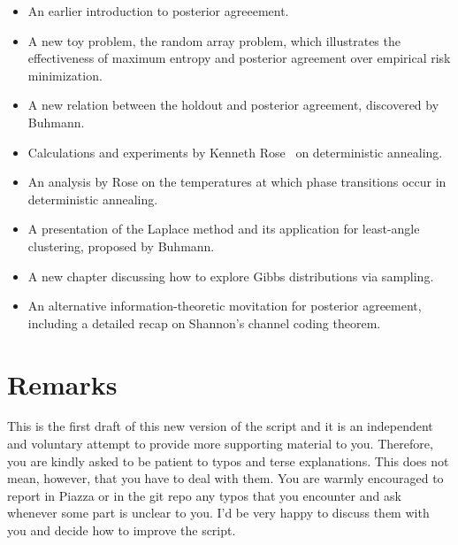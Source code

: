 \begin{itemize}
\item An earlier introduction to posterior agreeement.
\item A new toy problem, the random array problem, which illustrates
the effectiveness of maximum entropy and posterior agreement over
empirical risk minimization.
\item A new relation between the holdout and posterior agreement, discovered
by Buhmann.
\item Calculations and experiments by Kenneth Rose~\cite{rose1991deterministic, rose1998deterministic} on deterministic
annealing.
\item An analysis by Rose on the temperatures at which phase transitions
occur in deterministic annealing.
\item A presentation of the Laplace method and its application for least-angle
clustering, proposed by Buhmann.
\item A new chapter discussing how to explore Gibbs distributions via sampling.
\item An alternative information-theoretic movitation for posterior agreement,
including a detailed recap on Shannon's channel coding theorem.
\end{itemize}

\section*{Remarks}

This is the first draft of this new version of the script and it is an independent and voluntary attempt to provide more supporting material to you. Therefore, you
are kindly asked to be patient to typos and terse explanations. This does
not mean, however, that you have to deal with them. You are warmly
encouraged to report in Piazza or in the git repo any typos that you encounter and ask whenever
some part is unclear to you. I'd be very happy to discuss them with you
and decide how to improve the script.